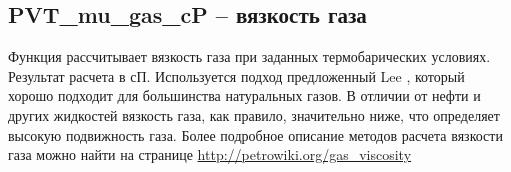 \newcommand{\MuDataFile}{data/Muo_P_data.txt}

\subsection{PVT\_mu\_gas\_cP – вязкость газа}

Функция рассчитывает вязкость газа при заданных термобарических условиях. Результат расчета в сП.  Используется подход предложенный Lee  \cite{Lee_1966}, который хорошо подходит для большинства натуральных газов. 
В отличии от нефти и других жидкостей вязкость газа, как правило, значительно ниже, что определяет высокую подвижность газа. 
Более подробное описание методов расчета вязкости газа можно найти на странице  \href{http://petrowiki.org/Gas_viscosity}{http://petrowiki.org/gas\_viscosity}



